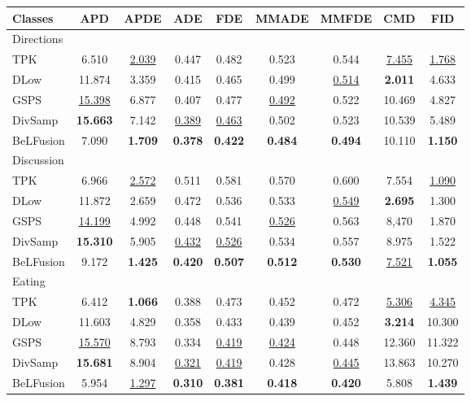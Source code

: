 \documentclass[10pt,twocolumn,letterpaper]{article}
\begin{document}
 
\setlength{\tabcolsep}{1.4pt}\begin{table*}[t!]\renewcommand{\arraystretch}{0.9}
\footnotesize		
\centering

\begin{minipage}{0.495\textwidth}
\begin{tabular}{lcccccccc@{\hskip 2mm}}
\toprule
Classes & APD & APDE  & ADE  & FDE  & MMADE  & MMFDE & CMD & FID\\

\midrule

Directions \\
\midrule
TPK & 6.510 & \underline{2.039} & 0.447 & 0.482 & 0.523 & 0.544 & \underline{7.455} & \underline{1.768}\\
DLow & 11.874 & 3.359 & 0.415 & 0.465 & 0.499 & \underline{0.514} & \textbf{2.011} & 4.633 \\
GSPS & \underline{15.398} & 6.877 & 0.407 & 0.477 & \underline{0.492} & 0.522 & 10.469 & 4.827 \\
DivSamp & \textbf{15.663} & 7.142 & \underline{0.389} & \underline{0.463} & 0.502 & 0.523 & 10.539 & 5.489 \\
BeLFusion & 7.090 & \textbf{1.709} & \textbf{0.378} & \textbf{0.422} & \textbf{0.484} & \textbf{0.494} & 10.110 & \textbf{1.150} \\
\midrule

Discussion \\
\midrule
TPK & 6.966 & \underline{2.572} & 0.511 & 0.581 & 0.570 & 0.600 & 7.554 & \underline{1.090} \\
DLow & 11.872 & 2.659 & 0.472 & 0.536 & 0.533 & \underline{0.549} & \textbf{2.695} & 1.300 \\
GSPS & \underline{14.199} & 4.992 & 0.448 & 0.541 & \underline{0.526} & 0.563 & 8,470 & 1.870 \\
DivSamp & \textbf{15.310} & 5.905 & \underline{0.432} & \underline{0.526} & 0.534 & 0.557 & 8.975 & 1.522 \\
BeLFusion & 9.172 & \textbf{1.425} & \textbf{0.420} & \textbf{0.507} & \textbf{0.512} & \textbf{0.530} & \underline{7.521} & \textbf{1.055} \\
\midrule

Eating \\
\midrule
TPK & 6.412 & \textbf{1.066} & 0.388 & 0.473 & 0.452 & 0.472 & \underline{5.306} & \underline{4.345} \\
DLow & 11.603 & 4.829 & 0.358 & 0.433 & 0.439 & 0.452 & \textbf{3.214} & 10.300 \\
GSPS & \underline{15.570} & 8.793 & 0.334 & \underline{0.419} & \underline{0.424} & 0.448 & 12.360 & 11.322 \\
DivSamp & \textbf{15.681} & 8.904 & \underline{0.321} & \underline{0.419} & 0.428 & \underline{0.445} & 13.863 & 10.270 \\
BeLFusion & 5.954 & \underline{1.297} & \textbf{0.310} & \textbf{0.381} & \textbf{0.418} & \textbf{0.420} & 5.808 & \textbf{1.439} \\
\midrule


\end{tabular}
\end{minipage}
\end{table*}
\end{document}
